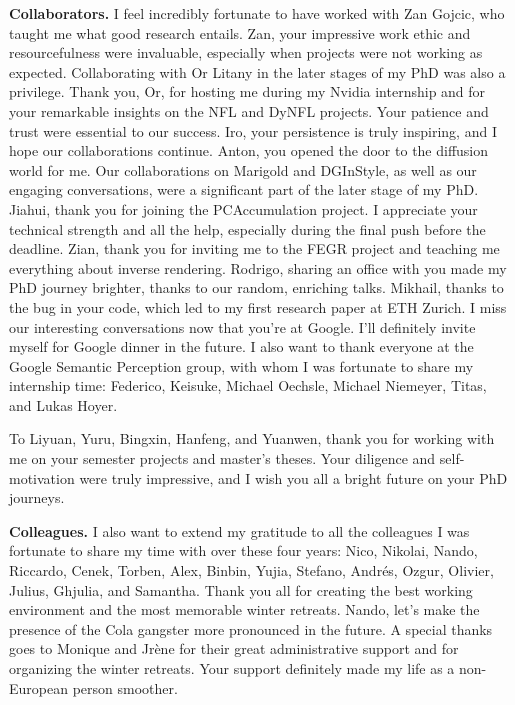 \noindent
\textbf{Collaborators.}
I feel incredibly fortunate to have worked with Zan Gojcic, who taught me what good research entails. Zan, your impressive work ethic and resourcefulness were invaluable, especially when projects were not working as expected. Collaborating with Or Litany in the later stages of my PhD was also a privilege. Thank you, Or, for hosting me during my Nvidia internship and for your remarkable insights on the NFL and DyNFL projects. Your patience and trust were essential to our success. Iro, your persistence is truly inspiring, and I hope our collaborations continue. Anton, you opened the door to the diffusion world for me. Our collaborations on Marigold and DGInStyle, as well as our engaging conversations, were a significant part of the later stage of my PhD. Jiahui, thank you for joining the PCAccumulation project. I appreciate your technical strength and all the help, especially during the final push before the deadline. Zian, thank you for inviting me to the FEGR project and teaching me everything about inverse rendering.  Rodrigo, sharing an office with you made my PhD journey brighter, thanks to our random, enriching talks. Mikhail, thanks to the bug in your code, which led to my first research paper at ETH Zurich. I miss our interesting conversations now that you're at Google. I'll definitely invite myself for Google dinner in the future. I also want to thank everyone at the Google Semantic Perception group, with whom I was fortunate to share my internship time: Federico, Keisuke, Michael Oechsle, Michael Niemeyer, Titas, and Lukas Hoyer.

To Liyuan, Yuru, Bingxin, Hanfeng, and Yuanwen, thank you for working with me on your semester projects and master's theses. Your diligence and self-motivation were truly impressive, and I wish you all a bright future on your PhD journeys.

\noindent
\textbf{Colleagues.}
I also want to extend my gratitude to all the colleagues I was fortunate to share my time with over these four years: Nico, Nikolai, Nando, Riccardo, Cenek, Torben, Alex, Binbin, Yujia, Stefano, Andrés, Ozgur, Olivier, Julius, Ghjulia, and Samantha. Thank you all for creating the best working environment and the most memorable winter retreats. Nando, let's make the presence of the Cola gangster more pronounced in the future. A special thanks goes to Monique and Jrène for their great administrative support and for organizing the winter retreats. Your support definitely made my life as a non-European person smoother. 

